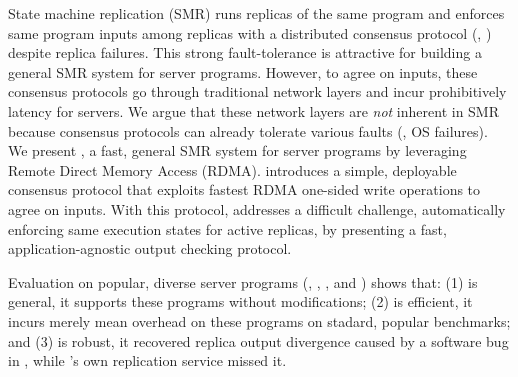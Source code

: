 

State machine replication (SMR) runs replicas of the same program and 
enforces same program inputs among replicas with a distributed consensus 
protocol (\eg, \paxos) despite replica failures. This strong 
fault-tolerance is attractive for building a general SMR system for server 
programs. However, to agree on inputs, these consensus protocols go through 
traditional network layers and incur prohibitively latency for servers. We 
argue that these network layers are \emph{not} inherent in SMR because 
consensus protocols can already tolerate various faults (\eg, OS failures). We 
present \xxx, a fast, general SMR system for server programs by leveraging 
Remote Direct Memory Access (RDMA). \xxx introduces a simple, deployable 
consensus protocol that exploits fastest RDMA one-sided write operations to 
agree on inputs. With this protocol, \xxx addresses a difficult challenge, 
automatically enforcing same execution states for active replicas, by presenting 
a fast, application-agnostic output checking protocol.

Evaluation on \nprog popular, diverse server programs (\eg, \memcached, \mysql, 
and \clamav) shows that: (1) \xxx is general, it supports these programs 
without modifications; (2) \xxx is efficient, it incurs merely \overhead mean 
overhead on these programs on stadard, popular benchmarks; and (3) \xxx is 
robust, it recovered replica output divergence caused by a software bug in 
\redis, while \redis's own replication service missed it.


